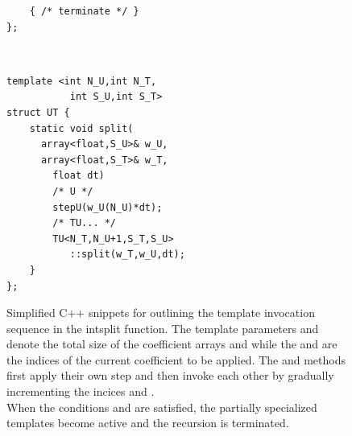 \begin{figure}[h]
\begin{minipage}[c]{\textwidth}
\begin{minipage}[r][10cm][t]{.4\textwidth}
\begin{minipage}[t]{\textwidth}
\begin{lstlisting}
	{ /* terminate */ }
};
\end{lstlisting}
			\end{minipage} \\
			\vspace{5mm}
			\begin{minipage}[t]{\textwidth}
\begin{lstlisting}
template <int N_U,int N_T,
           int S_U,int S_T>
struct UT {
	static void split(
	  array<float,S_U>& w_U,
	  array<float,S_T>& w_T,
		float dt)
		/* U */
		stepU(w_U(N_U)*dt);
		/* TU... */
		TU<N_T,N_U+1,S_T,S_U>
		   ::split(w_T,w_U,dt);
	}
};
\end{lstlisting}
			\end{minipage}
	\end{minipage}


	\end{minipage}
	\label{fig:intsplit}
	\caption{Simplified C++ snippets for outlining the template invocation sequence in the intsplit function. The template parameters  and  denote the total size of the coefficient arrays  and  while the  and  are the indices of the current coefficient to be applied. The  and  methods first apply their own step and then invoke each other by gradually incrementing the incices  and . \\
	When the conditions  and  are satisfied, the partially specialized templates become active and the recursion is terminated.}
\end{figure}
